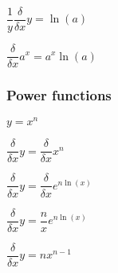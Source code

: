 \(\dfrac{1}{y}\dfrac{\delta }{\delta x}y=\ln(a)\)

\(\dfrac{\delta }{\delta x}a^x=a^x\ln(a)\)

\subsubsection{Power functions}

\(y=x^n\)

\(\dfrac{\delta }{\delta x}y=\dfrac{\delta }{\delta x}x^n\)

\(\dfrac{\delta }{\delta x}y=\dfrac{\delta }{\delta x}e^{n\ln(x)}\)

\(\dfrac{\delta }{\delta x}y=\dfrac{n}{x}e^{n\ln(x)}\)

\(\dfrac{\delta }{\delta x}y=nx^{n-1}\)

